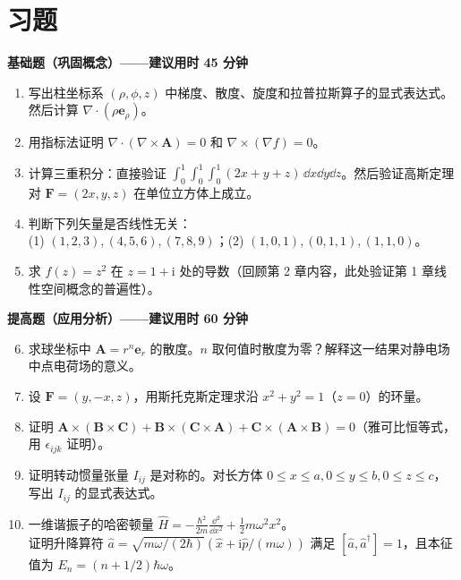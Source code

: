 \section*{习题}

\textbf{基础题（巩固概念）——建议用时 45 分钟}

\begin{enumerate}
  \item 写出柱坐标系 $(\rho,\phi,z)$ 中梯度、散度、旋度和拉普拉斯算子的显式表达式。然后计算 $\nabla\cdot(\rho\mathbf{e}_\rho)$。
  \item 用指标法证明 $\nabla\cdot(\nabla\times\mathbf{A}) = 0$ 和 $\nabla\times(\nabla f) = 0$。
  \item 计算三重积分：直接验证 $\displaystyle\int_0^1\int_0^1\int_0^1 (2x+y+z)\,\dd x\dd y\dd z$。然后验证高斯定理对 $\mathbf{F}=(2x,y,z)$ 在单位立方体上成立。
  \item 判断下列矢量是否线性无关：\\ (1) $(1,2,3),(4,5,6),(7,8,9)$；(2) $(1,0,1),(0,1,1),(1,1,0)$。
  \item 求 $f(z)=z^2$ 在 $z=1+\mathrm{i}$ 处的导数（回顾第 2 章内容，此处验证第 1 章线性空间概念的普遍性）。
\end{enumerate}

\textbf{提高题（应用分析）——建议用时 60 分钟}

\begin{enumerate}
  \setcounter{enumi}{5}
  \item 求球坐标中 $\mathbf{A}=r^n\mathbf{e}_r$ 的散度。$n$ 取何值时散度为零？解释这一结果对静电场中点电荷场的意义。
  \item 设 $\mathbf{F}=(y,-x,z)$，用斯托克斯定理求沿 $x^2+y^2=1$（$z=0$）的环量。
  \item 证明 $\mathbf{A}\times(\mathbf{B}\times\mathbf{C}) + \mathbf{B}\times(\mathbf{C}\times\mathbf{A}) + \mathbf{C}\times(\mathbf{A}\times\mathbf{B}) = 0$（雅可比恒等式，用 $\epsilon_{ijk}$ 证明）。
  \item 证明转动惯量张量 $I_{ij}$ 是对称的。对长方体 $0\leq x\leq a,0\leq y\leq b,0\leq z\leq c$，写出 $I_{ij}$ 的显式表达式。
  \item 一维谐振子的哈密顿量 $\hat{H} = -\frac{\hbar^2}{2m}\frac{\dd^2}{\dd x^2} + \frac12 m\omega^2 x^2$。\\ 证明升降算符 $\hat{a} = \sqrt{m\omega/(2\hbar)}(\hat{x} + \mathrm{i}\hat{p}/(m\omega))$ 满足 $[\hat{a},\hat{a}^\dagger]=1$，且本征值为 $E_n = (n+1/2)\hbar\omega$。
\end{enumerate}

